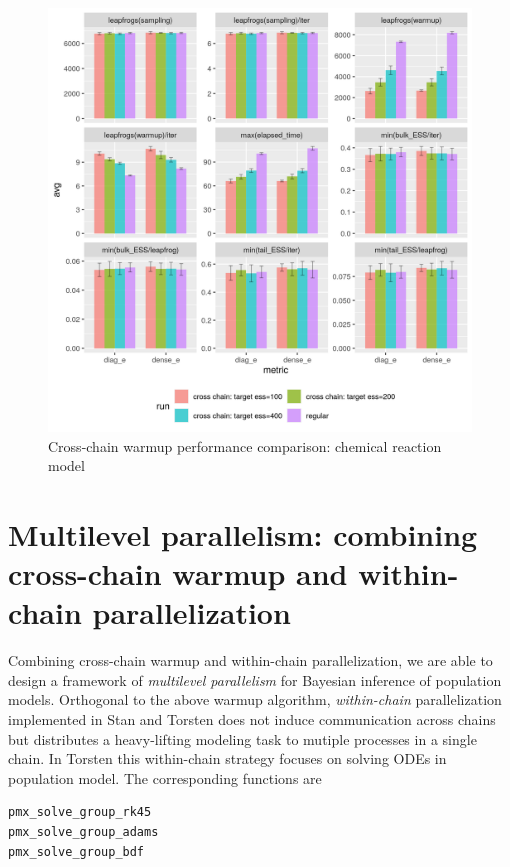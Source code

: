 \documentclass[11pt, reqno, oneside]{amsart}
\begin{document}
\begin{figure}[htbp]
\centering
\includegraphics[width=\textwidth]{./figure/cross_chain_ess_effect_chem.png}
\caption{Cross-chain warmup performance comparison: chemical reaction model}
\end{figure}


\section{Multilevel parallelism: combining cross-chain warmup and within-chain parallelization}
\label{sec:org55bc3f7}
Combining cross-chain warmup and
within-chain parallelization, we are able to design a framework of
\emph{multilevel parallelism} for Bayesian inference of population
models. Orthogonal to the above warmup algorithm, \emph{within-chain}
parallelization implemented in Stan
and Torsten does not induce communication across chains but distributes a
heavy-lifting modeling task to mutiple processes in a single
chain. In Torsten this within-chain strategy focuses on solving ODEs
in population model. The corresponding functions are \cite{torsten_pmx_group}
\begin{verbatim}
pmx_solve_group_rk45
pmx_solve_group_adams
pmx_solve_group_bdf
\end{verbatim}
\end{document}
